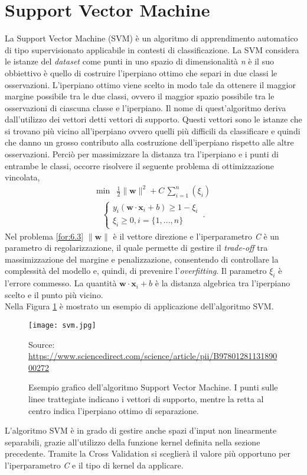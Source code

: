 \section{Support Vector Machine}
La Support Vector Machine (SVM) \autocite{GHOLAMI2017515} è un algoritmo di apprendimento automatico di tipo supervisionato applicabile in contesti di classificazione. La SVM considera le istanze del \emph{dataset} come punti in uno spazio di dimensionalità \emph{n} è il suo obbiettivo è quello di costruire l'iperpiano ottimo che separi in due classi le osservazioni. L'iperpiano ottimo viene scelto in modo tale da ottenere il maggior margine possibile tra le due classi, ovvero il maggior spazio possibile tra le osservazioni di ciascuna classe e l'iperpiano. Il nome di quest'algoritmo deriva dall'utilizzo dei vettori detti vettori di supporto. Questi vettori sono le istanze che si trovano più vicino all'iperpiano ovvero quelli più difficili da classificare e quindi che danno un grosso contributo alla costruzione dell'iperpiano rispetto alle altre osservazioni. Perciò per massimizzare la distanza tra l'iperpiano e i punti di entrambe le classi, occorre risolvere il seguente problema di ottimizzazione vincolata, 
\begin{align}
	\text{min} & \frac{1}{2} \|\mathbf{w}\|^2 + C \, \sum_{i=1}^{n} (\xi_i) \label{for:6.3}
\end{align}
\begin{align*} 
	\begin{cases}
		y_i(\mathbf{w \cdot x}_i + b) \geq  1 - \xi_i \\
		\xi_i \geq 0, i=\{1,...,n\}
	\end{cases} \, .
\end{align*}
Nel problema \ref{for:6.3} $\|\mathbf{w}\|$ è il vettore direzione e l'iperparametro \emph{C} è un parametro di regolarizzazione, il quale permette di gestire il \emph{trade-off} tra massimizzazione del margine e penalizzazione, consentendo di controllare la complessità del modello e, quindi, di prevenire l'\emph{overfitting}. Il parametro $\xi_i$ è l'errore commesso. La quantità $\mathbf{w \cdot x}_i + b$ è la distanza algebrica tra l'iperpiano scelto e il punto più vicino.\\
Nella Figura \ref{fig:svm} è mostrato un esempio di applicazione dell'algoritmo SVM.
\begin{figure}[h]
	\begin{center}
		\texttt{[image: svm.jpg]}
		\caption{Esempio grafico dell'algoritmo Support Vector Machine. I punti sulle linee trattegiate indicano i vettori di supporto, mentre la retta al centro indica l'iperpiano ottimo di separazione.
		} 
		Source: \url{https://www.sciencedirect.com/science/article/pii/B9780128113189000272}\label{fig:svm}
	\end{center}
\end{figure}
L'algoritmo SVM è in grado di gestire anche spazi d'input non linearmente separabili, grazie all'utilizzo della funzione kernel definita nella sezione precedente. Tramite la Cross Validation si sceglierà il valore più opportuno per l'iperparametro \emph{C} e il tipo di kernel da applicare.

